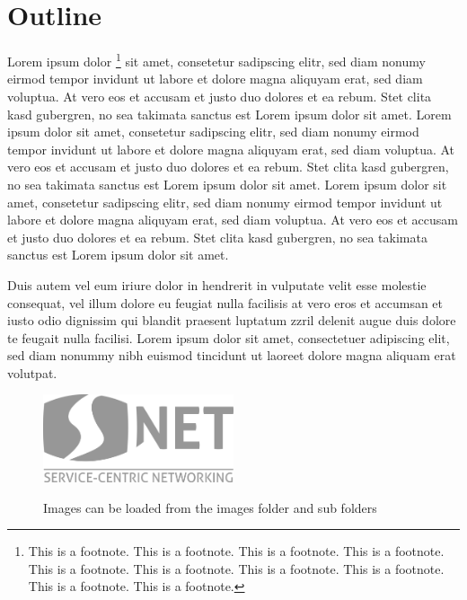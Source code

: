 \chapter{Outline}
\label{cha:outline}

Lorem ipsum \cite{FakePaper11} dolor \footnote{This is a footnote. This is a footnote. This is a footnote. This is a footnote. This is a footnote. This is a footnote. This is a footnote. This is a footnote. This is a footnote. This is a footnote. } sit amet, consetetur sadipscing elitr, sed diam \cite{FakeWebPage11} nonumy eirmod tempor invidunt ut labore et dolore magna aliquyam erat, sed diam voluptua. At vero eos et accusam et justo duo dolores et ea rebum. Stet clita kasd gubergren, no sea takimata sanctus est Lorem ipsum dolor sit amet. Lorem ipsum dolor sit amet, consetetur sadipscing elitr, sed diam nonumy eirmod tempor invidunt ut labore et dolore magna aliquyam erat, sed diam voluptua. At vero eos et accusam et justo duo dolores et ea rebum. Stet clita kasd gubergren, no sea takimata sanctus est Lorem ipsum dolor sit amet. Lorem ipsum dolor sit amet, consetetur sadipscing elitr, sed diam nonumy eirmod tempor invidunt ut labore et dolore magna aliquyam erat, sed diam voluptua. At vero eos et accusam et justo duo dolores et ea rebum. Stet clita kasd gubergren, no sea takimata sanctus est Lorem ipsum dolor sit amet.

Duis autem vel eum iriure dolor in hendrerit in vulputate velit esse molestie consequat, vel illum dolore eu feugiat nulla facilisis at vero eros et accumsan et iusto odio dignissim qui blandit praesent luptatum zzril delenit augue duis dolore te feugait nulla facilisi. Lorem ipsum dolor sit amet, consectetuer adipiscing elit, sed diam nonummy nibh euismod tincidunt ut laoreet dolore magna aliquam erat volutpat.

\begin{figure}[!ht]
	\centering
	\includegraphics[width=0.5\textwidth]{images/snet_logo_gray.png}\\
	\caption{Images can be loaded from the images folder and sub folders}
	\label{fig:introduction__loremipsum}
\end{figure}

